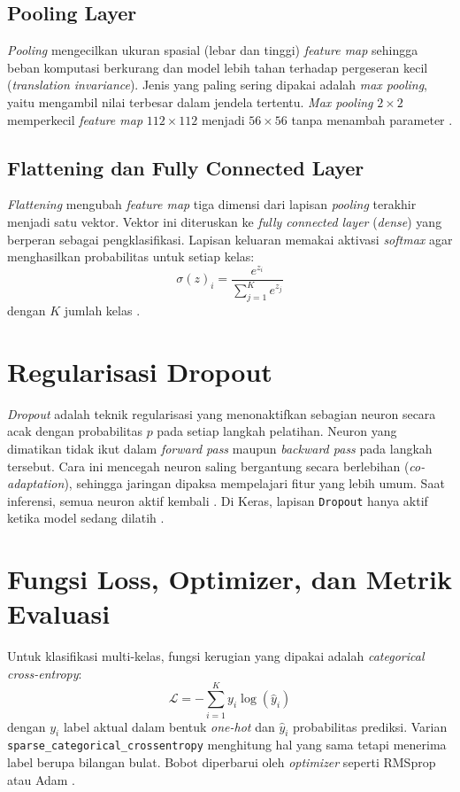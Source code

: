 \documentclass[a4paper,oneside,12pt]{report}
\begin{document}
\subsection{Pooling Layer}
\textit{Pooling} mengecilkan ukuran spasial (lebar dan tinggi) \textit{feature map} sehingga beban komputasi berkurang dan model lebih tahan terhadap pergeseran kecil (\textit{translation invariance}). Jenis yang paling sering dipakai adalah \textit{max pooling}, yaitu mengambil nilai terbesar dalam jendela tertentu. \textit{Max pooling} $2 \times 2$ memperkecil \textit{feature map} $112 \times 112$ menjadi $56 \times 56$ tanpa menambah parameter \cite{goodfellow2016}.

\subsection{Flattening dan Fully Connected Layer}
\textit{Flattening} mengubah \textit{feature map} tiga dimensi dari lapisan \textit{pooling} terakhir menjadi satu vektor. Vektor ini diteruskan ke \textit{fully connected layer} (\textit{dense}) yang berperan sebagai pengklasifikasi. Lapisan keluaran memakai aktivasi \textit{softmax} agar menghasilkan probabilitas untuk setiap kelas:
\begin{equation}
	\sigma(z)_i = \frac{e^{z_i}}{\sum_{j=1}^{K} e^{z_j}}
\end{equation}
dengan $K$ jumlah kelas \cite{oshea2015}.

\section{Regularisasi Dropout}
\textit{Dropout} adalah teknik regularisasi yang menonaktifkan sebagian neuron secara acak dengan probabilitas $p$ pada setiap langkah pelatihan. Neuron yang dimatikan tidak ikut dalam \textit{forward pass} maupun \textit{backward pass} pada langkah tersebut. Cara ini mencegah neuron saling bergantung secara berlebihan (\textit{co-adaptation}), sehingga jaringan dipaksa mempelajari fitur yang lebih umum. Saat inferensi, semua neuron aktif kembali \cite{srivastava2014}. Di Keras, lapisan \texttt{Dropout} hanya aktif ketika model sedang dilatih \cite{keras-dropout}.

\section{Fungsi Loss, Optimizer, dan Metrik Evaluasi}
Untuk klasifikasi multi-kelas, fungsi kerugian yang dipakai adalah \textit{categorical cross-entropy}:
\begin{equation}
	\mathcal{L} = -\sum_{i=1}^{K} y_i \log(\hat{y}_i)
\end{equation}
dengan $y_i$ label aktual dalam bentuk \textit{one-hot} dan $\hat{y}_i$ probabilitas prediksi. Varian \texttt{sparse\_categorical\_crossentropy} menghitung hal yang sama tetapi menerima label berupa bilangan bulat. Bobot diperbarui oleh \textit{optimizer} seperti RMSprop atau Adam \cite{goodfellow2016}.
\end{document}
